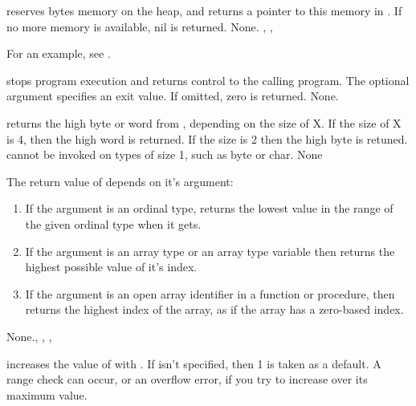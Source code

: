 \documentclass{report}
\begin{document}
\html{}

{ reserves  bytes memory on the heap, and returns a
pointer to this memory in . If no more memory is available, nil is
returned.}
{None.}
{, , }

For an example, see .

{ stops program execution and returns control to the calling
program. The optional argument  specifies an exit value. If
omitted, zero is returned.}
{None.}
{}

\html{}

{ returns the high byte or word from , depending on the size
of X. If the size of X is 4, then the high word is returned. If the size is
2 then the high byte is retuned. 
 cannot be invoked on types of size 1, such as byte or char.}
{None}
{}

\html{}

{ The return value of  depends on it's argument:
\begin{enumerate}
\item If the argument is an ordinal type,  returns the lowest value in the range of the given ordinal 
type when it gets.
\item If the argument is an array type or an array type variable then 
 returns the highest possible value of it's index.
\item If the argument is an open array identifier in a function or
procedure, then  returns the highest index of the array, as if the
array has a zero-based index.
\end{enumerate}
}{None.}{, , , }

\html{}

{ increases the value of  with .
If  isn't specified, then 1 is taken as a default.}
{A range check can occur, or an overflow error, if you try to increase 
over its maximum value.}
{}
\end{document}
